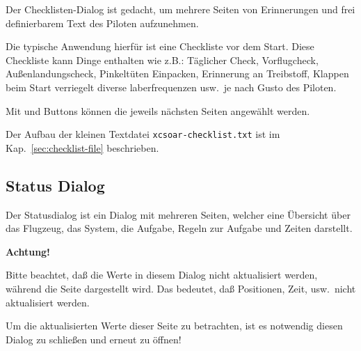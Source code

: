 Der Checklisten-Dialog ist gedacht, um mehrere Seiten von Erinnerungen 
 und 
frei definierbarem Text des Piloten aufzunehmen. 

Die typische Anwendung hierfür ist eine Checkliste vor dem Start. Diese Checkliste kann Dinge enthalten wie z.B.:
Täglicher Check, Vorflugcheck, Außenlandungscheck, Pinkeltüten Einpacken, Erinnerung an Treibstoff, 
Klappen beim Start verriegelt diverse laberfrequenzen usw.\ je nach Gusto des Piloten.  

Mit  \button{$<$} und \button{$>$} Buttons  können die jeweils nächsten Seiten angewählt werden.

Der Aufbau der kleinen Textdatei \verb|xcsoar-checklist.txt| ist im Kap.~\ref{sec:checklist-file} beschrieben. 


\subsection*{Status Dialog}

Der Statusdialog ist ein Dialog mit mehreren Seiten, welcher eine Übersicht über das Flugzeug, das System, die Aufgabe, Regeln zur Aufgabe und Zeiten darstellt. 

\textbf{Achtung!}

Bitte beachtet, daß die Werte in diesem Dialog nicht aktualisiert werden, während die Seite dargestellt wird.
Das bedeutet, daß Positionen, Zeit, usw.\ nicht aktualisiert werden. 

Um die aktualisierten Werte dieser Seite zu betrachten, ist es notwendig diesen Dialog zu schließen und erneut zu öffnen!  

